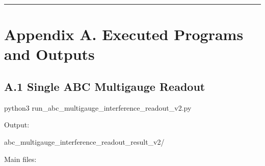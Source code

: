 \documentclass[
  a4paper,
]{article}
\newenvironment{Shaded}{}{}
\newcommand{\NormalTok}[1]{#1}
\begin{document}
\begin{center}\rule{0.5\linewidth}{0.5pt}\end{center}

\section{Appendix A. Executed Programs and
Outputs}\label{appendix-a.-executed-programs-and-outputs}

\subsection{A.1 Single ABC Multigauge
Readout}\label{a.1-single-abc-multigauge-readout}

\begin{Shaded}
\begin{Highlighting}[]
\NormalTok{python3 run\_abc\_multigauge\_interference\_readout\_v2.py}
\end{Highlighting}
\end{Shaded}

Output:

\begin{Shaded}
\begin{Highlighting}[]
\NormalTok{abc\_multigauge\_interference\_readout\_result\_v2/}
\end{Highlighting}
\end{Shaded}

Main files:
\end{document}
